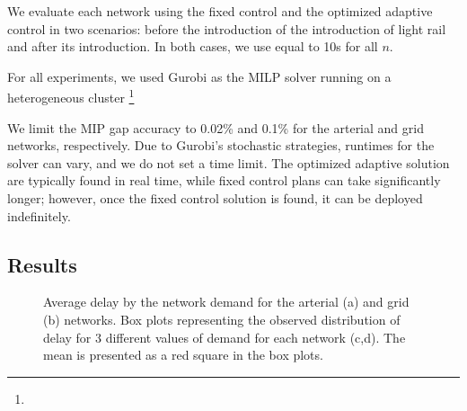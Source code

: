 We evaluate each network using the fixed control and the optimized adaptive
control in two scenarios: before the introduction of the introduction of light
rail and after its introduction. In both cases, we use \DT[] equal to 10s for
all $n$.

For all experiments, we used Gurobi as the MILP solver running on a
heterogeneous cluster \footnote{}

We limit the MIP gap accuracy to 0.02\% and 0.1\% for the arterial and grid
networks, respectively.
%
Due to Gurobi's stochastic strategies, runtimes for the solver can vary,
and we do not set a time limit.
%
The optimized adaptive solution are typically found in real time, while fixed
control plans can take significantly longer; however, once the fixed control
solution is found, it can be deployed indefinitely.




\subsection{Results}

\begin{figure*}[t!] \centering
%
\caption{Average delay by the network demand for the arterial (a) and grid (b)
networks. Box plots representing the observed distribution of delay for 3
different values of demand for each network (c,d). The mean is presented as a
red square in the box plots.}
%
\label{fig:delayCurveAndBoxplot} \end{figure*}


%


